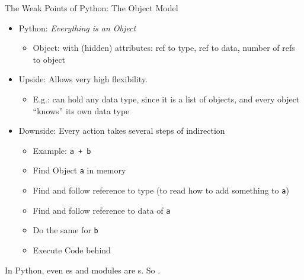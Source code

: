 
\begin{frame}[fragile]{The Weak Points of Python: The Object Model}
%
\begin{itemize}
\item Python: \emph{Everything is an Object}
	\begin{itemize}
	\item Object:  with (hidden) attributes: ref to type, ref to data, number of refs to object
	\end{itemize}
\item Upside: Allows very high flexibility. 
	\begin{itemize}
	\item E.\;g.:  can hold any data type, since it is a list of objects, and every object \enquote{knows} its own data type
	\end{itemize}
\item Downside: Every action takes several steps of indirection
	\begin{itemize}
	\item Example: \texttt{a + b}
	\item Find Object \texttt{a} in memory
	\item Find and follow reference to type (to read how to add something to \texttt{a})
	\item Find and follow reference to data of \texttt{a}
	\item Do the same for \texttt{b}
	\item Execute Code behind 
	\end{itemize}
\end{itemize}
%
\begin{hintbox}
\scriptsize
In Python, even es and modules are s. So .
\end{hintbox}
%
\end{frame}


